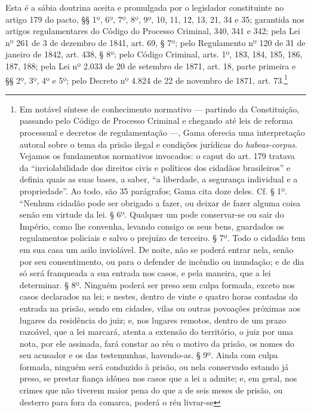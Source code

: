 {Esta é a sábia doutrina aceita e promulgada por o legislador
constituinte no artigo 179 do pacto, §§ 1º, 6º, 7º, 8º, 9º, 10, 11, 12,
13, 21, 34 e 35; garantida nos artigos regulamentares do Código do
Processo Criminal, 340, 341 e 342; pela Lei nº 261 de 3 de dezembro de
1841, art. 69, § 7º; pelo Regulamento nº 120 de 31 de janeiro de 1842,
art. 438, § 8º; pelo Código Criminal, arts. 1º, 183, 184, 185, 186, 187,
188; pela Lei nº 2.033 de 20 de setembro de 1871, art. 18, parte
primeira e §§ 2º, 3º, 4º e 5º; pelo Decreto nº 4.824 de 22 de novembro
de 1871, art. 73.\footnote{Em notável síntese de conhecimento
  normativo --- partindo da Constituição, passando pelo Código de Processo
  Criminal e chegando até leis de reforma processual e decretos de
  regulamentação ---, Gama oferecia uma interpretação autoral sobre o
  tema da prisão ilegal e condições jurídicas do \emph{habeas-corpus}.
  Vejamos os fundamentos normativos invocados: o caput do art. 179
  tratava da ``inviolabilidade dos direitos civis e políticos dos
  cidadãos brasileiros'' e definia quais as suas bases, a saber, ``a
  liberdade, a segurança individual e a propriedade''. Ao todo, são 35
  parágrafos; Gama cita doze deles. Cf. § 1º. ``Nenhum cidadão pode ser
  obrigado a fazer, ou deixar de fazer alguma coisa senão em virtude da
  lei. § 6º. Qualquer um pode conservar-se ou sair do Império,
  como lhe convenha, levando consigo os seus bens, guardados os
  regulamentos policiais e salvo o prejuízo de terceiro. § 7º. Todo o
  cidadão tem em sua casa um asilo inviolável. De noite, não se poderá
  entrar nela, senão por seu consentimento, ou para o defender de
  incêndio ou inundação; e de dia só será franqueada a sua entrada nos
  casos, e pela maneira, que a lei determinar. § 8º. Ninguém poderá ser %
  preso sem culpa formada, exceto nos casos declarados na lei; e nestes,
  dentro de vinte e quatro horas contadas da entrada na prisão, sendo em
  cidades, vilas ou outras povoações próximas aos lugares da residência
  do juiz; e, nos lugares remotos, dentro de um prazo razoável, que a
  lei marcará, atenta a extensão do território, o juiz por uma nota, por
  ele assinada, fará constar ao réu o motivo da prisão, os nomes do seu
  acusador e os das testemunhas, havendo-as. § 9º. Ainda com culpa
  formada, ninguém será conduzido à prisão, ou nela conservado estando
  já preso, se prestar fiança idônea nos casos que a lei a admite; e, em
  geral, nos crimes que não tiverem maior pena do que a de seis meses de
  prisão, ou desterro para fora da comarca, poderá o réu livrar-se
}}
